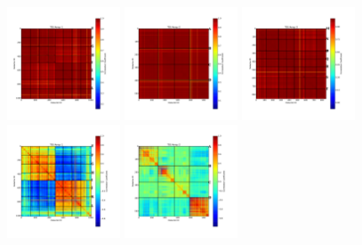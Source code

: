 \begin{figure}[ht] %
\begin{center}
\includegraphics[width=0.3\textwidth]{Figures/NoiseTests/corrmat_TOI_array_1_20170228s151.pdf}
\includegraphics[width=0.3\textwidth]{Figures/NoiseTests/corrmat_TOI_array_2_20170228s151.pdf}
\includegraphics[width=0.3\textwidth]{Figures/NoiseTests/corrmat_TOI_array_3_20170228s151.pdf}
\includegraphics[width=0.3\textwidth]{Figures/NoiseTests/corrmat_TOI_CM_array_1_20170228s151.pdf}
\includegraphics[width=0.3\textwidth]{Figures/NoiseTests/corrmat_TOI_CM_array_2_20170228s151.pdf}

\end{center}
\end{figure}
